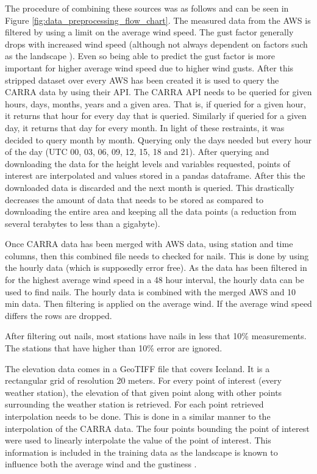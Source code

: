 The procedure of combining these sources was as follows and can be seen in Figure \ref{fig:data_preprocessing_flow_chart}. The measured data from the AWS is filtered by using a limit on the average wind speed. The gust factor generally drops with increased wind speed (although not always dependent on factors such as the landscape \cite{GNP_vidtal}). Even so being able to predict the gust factor is more important for higher average wind speed due to higher wind gusts. After this stripped dataset over every AWS has been created it is used to query the CARRA data by using their API. The CARRA API needs to be queried for given hours, days, months, years and a given area. That is, if queried for a given hour, it returns that hour for every day that is queried. Similarly if queried for a given day, it returns that day for every month. In light of these restraints, it was decided to query month by month. Querying only the days needed but every hour of the day (UTC 00, 03, 06, 09, 12, 15, 18 and 21). After querying and downloading the data for the height levels and variables requested, points of interest are interpolated and values stored in a pandas dataframe. After this the downloaded data is discarded and the next month is queried. This drastically decreases the amount of data that needs to be stored as compared to downloading the entire area and keeping all the data points (a reduction from several terabytes to less than a gigabyte).

Once CARRA data has been merged with AWS data, using station and time columns, then this combined file needs to checked for nails. This is done by using the hourly data (which is supposedly error free). As the data has been filtered in for the highest average wind speed in a 48 hour interval, the hourly data can be used to find nails. The hourly data is combined with the merged AWS and 10 min data. Then filtering is applied on the average wind. If the average wind speed differs the rows are dropped.

After filtering out nails, most stations have nails in less that 10\% measurements. The stations that have higher than 10\% error are ignored.

The elevation data comes in a GeoTIFF file that covers Iceland. It is a rectangular grid of resolution 20 meters. For every point of interest (every weather station), the elevation of that given point along with other points surrounding the weather station is retrieved. For each point retrieved interpolation needs to be done. This is done in a similar manner to the interpolation of the CARRA data. The four points bounding the point of interest were used to linearly interpolate the value of the point of interest. This information is included in the training data as the landscape is known to influence both the average wind and the gustiness \cite{GNP_vidtal}.

